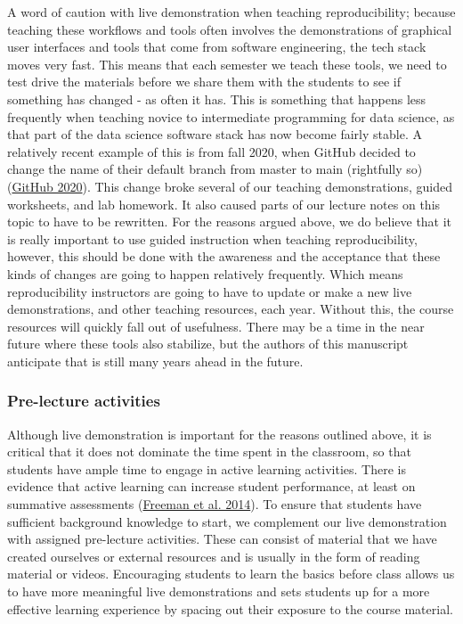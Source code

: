 \documentclass[
  12 pt,
]{paper}
\begin{document}
A word of caution with live demonstration when teaching reproducibility;
because teaching these workflows and tools often involves
the demonstrations of graphical user interfaces
and tools that come from software engineering,
the tech stack moves very fast.
This means that each semester we teach these tools,
we need to test drive the materials before we share them with the students
to see if something has changed - as often it has.
This is something that happens less frequently when teaching
novice to intermediate programming for data science,
as that part of the data science software stack has now become fairly stable.
A relatively recent example of this is from fall 2020,
when GitHub decided to change the name of their default branch
from master to main (rightfully so) (\protect\hyperlink{ref-__ak}{GitHub 2020}).
This change broke several of our teaching demonstrations,
guided worksheets, and lab homework.
It also caused parts of our lecture notes on this topic to have to be rewritten.
For the reasons argued above, we do believe that it is really important
to use guided instruction when teaching reproducibility,
however, this should be done with the awareness and the acceptance
that these kinds of changes are going to happen relatively frequently.
Which means reproducibility instructors are going to have to
update or make a new live demonstrations, and other teaching resources,
each year.
Without this, the course resources will quickly fall out of usefulness.
There may be a time in the near future where these tools also stabilize,
but the authors of this manuscript anticipate that is still
many years ahead in the future.

\hypertarget{pre-lecture-activities}{%
\subsubsection{Pre-lecture activities}\label{pre-lecture-activities}}

Although live demonstration is important for the reasons outlined above,
it is critical that it does not dominate the time spent in the classroom,
so that students have ample time to engage in active learning activities.
There is evidence that active learning can increase student performance,
at least on summative assessments (\protect\hyperlink{ref-freeman2014active}{Freeman et al. 2014}).
To ensure that students have sufficient background knowledge
to start, we complement our live demonstration with assigned pre-lecture activities.
These can consist of material that we have created ourselves or external resources
and is usually in the form of reading material or videos.
Encouraging students to learn the basics before class
allows us to have more meaningful live demonstrations
and sets students up for a more effective learning experience
by spacing out their exposure to the course material.
\end{document}
